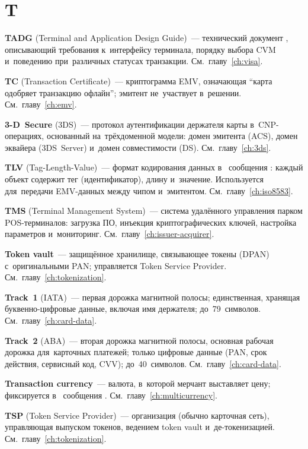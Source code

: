 \section*{T}

\textbf{TADG} (Terminal and Application Design Guide)~---
технический документ , описывающий требования
к~интерфейсу терминала, порядку выбора CVM и~поведению
при~различных статусах
транзакции. См.~главу~\ref{ch:visa}.

\textbf{TC} (Transaction Certificate)~--- криптограмма EMV,
означающая \enquote{карта одобряет транзакцию офлайн}; эмитент
не~участвует в~решении. См.~главу~\ref{ch:emv}.

\textbf{3-D~Secure} (3DS)~--- протокол аутентификации держателя
карты в~CNP-операциях, основанный на~трёхдоменной модели: домен
эмитента (ACS), домен эквайера (3DS~Server) и~домен
совместимости (DS). См.~главу~\ref{ch:3ds}.

\textbf{TLV} (Tag-Length-Value)~--- формат кодирования данных
в~ сообщения : каждый объект содержит тег
(идентификатор), длину и~значение. Используется для~передачи
EMV-данных между чипом
и~эмитентом. См.~главу~\ref{ch:iso8583}.

\textbf{TMS} (Terminal Management System)~--- система
удалённого управления парком POS-терминалов: загрузка ПО,
инъекция криптографических ключей, настройка параметров
и~мониторинг. См.~главу~\ref{ch:issuer-acquirer}.

\textbf{Token vault}~--- защищённое хранилище, связывающее
токены (DPAN) с~оригинальными PAN; управляется Token Service
Provider. См.~главу~\ref{ch:tokenization}.

\textbf{Track~1} (IATA)~--- первая дорожка магнитной полосы;
единственная, хранящая буквенно-цифровые данные, включая имя
держателя; до~79~символов. См.~главу~\ref{ch:card-data}.

\textbf{Track~2} (ABA)~--- вторая дорожка магнитной полосы,
основная рабочая дорожка для~карточных платежей; только цифровые
данные (PAN, срок действия, сервисный код, CVV);
до~40~символов. См.~главу~\ref{ch:card-data}.

\textbf{Transaction currency}~--- валюта, в~которой мерчант
выставляет цену; фиксируется в~ сообщения
. См.~главу~\ref{ch:multicurrency}.

\textbf{TSP} (Token Service Provider)~--- организация (обычно
карточная сеть), управляющая выпуском токенов, ведением token
vault и~де-токенизацией. См.~главу~\ref{ch:tokenization}.

